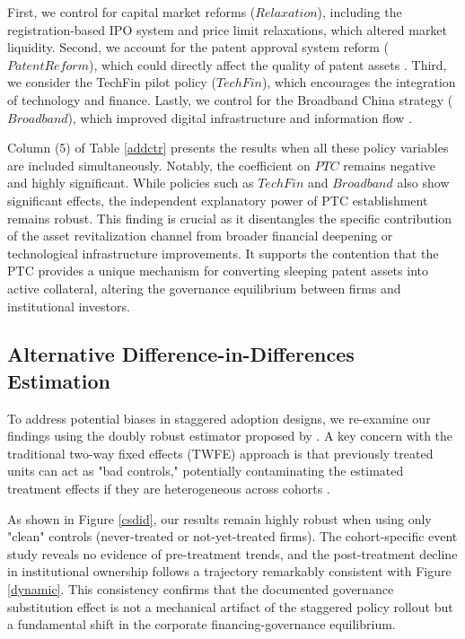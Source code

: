 \documentclass[12pt,a4paper]{article}
\begin{document}
First, we control for capital market reforms ($Relaxation$), including the registration-based IPO system and price limit relaxations, which altered market liquidity. Second, we account for the patent approval system reform ($PatentReform$), which could directly affect the quality of patent assets \citep{gill2024leveraging}. Third, we consider the TechFin pilot policy ($TechFin$), which encourages the integration of technology and finance. Lastly, we control for the Broadband China strategy ($Broadband$), which improved digital infrastructure and information flow \citep{li2025broadband}.

Column (5) of Table \ref{addctr} presents the results when all these policy variables are included simultaneously. Notably, the coefficient on $PTC$ remains negative and highly significant. While policies such as $TechFin$ and $Broadband$ also show significant effects, the independent explanatory power of PTC establishment remains robust. This finding is crucial as it disentangles the specific contribution of the asset revitalization channel from broader financial deepening or technological infrastructure improvements. It supports the contention that the PTC provides a unique mechanism for converting sleeping patent assets into active collateral, altering the governance equilibrium between firms and institutional investors.

\subsection{Alternative Difference-in-Differences Estimation}
To address potential biases in staggered adoption designs, we re-examine our findings using the doubly robust estimator proposed by \cite{callaway2021difference}. A key concern with the traditional two-way fixed effects (TWFE) approach is that previously treated units can act as "bad controls," potentially contaminating the estimated treatment effects if they are heterogeneous across cohorts \citep{goodman2021difference}.

As shown in Figure \ref{csdid}, our results remain highly robust when using only "clean" controls (never-treated or not-yet-treated firms). The cohort-specific event study reveals no evidence of pre-treatment trends, and the post-treatment decline in institutional ownership follows a trajectory remarkably consistent with Figure \ref{dynamic}. This consistency confirms that the documented governance substitution effect is not a mechanical artifact of the staggered policy rollout but a fundamental shift in the corporate financing-governance equilibrium.
\end{document}
